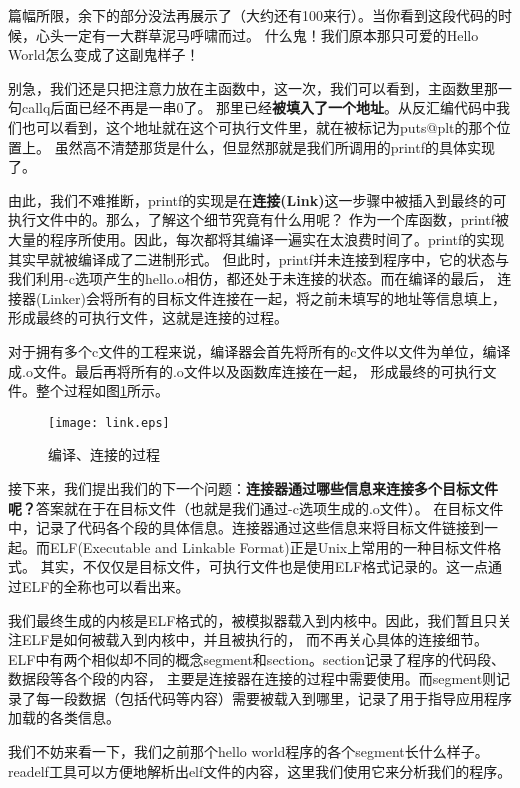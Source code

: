 篇幅所限，余下的部分没法再展示了（大约还有100来行）。当你看到这段代码的时候，心头一定有一大群草泥马呼啸而过。
什么鬼！我们原本那只可爱的Hello World怎么变成了这副鬼样子！

别急，我们还是只把注意力放在主函数中，这一次，我们可以看到，主函数里那一句callq后面已经不再是一串0了。
那里已经\textbf{被填入了一个地址}。从反汇编代码中我们也可以看到，这个地址就在这个可执行文件里，就在被标记为puts@plt的那个位置上。
虽然高不清楚那货是什么，但显然那就是我们所调用的printf的具体实现了。

由此，我们不难推断，printf的实现是在\textbf{连接(Link)}这一步骤中被插入到最终的可执行文件中的。那么，了解这个细节究竟有什么用呢？
作为一个库函数，printf被大量的程序所使用。因此，每次都将其编译一遍实在太浪费时间了。printf的实现其实早就被编译成了二进制形式。
但此时，printf并未连接到程序中，它的状态与我们利用-c选项产生的hello.o相仿，都还处于未连接的状态。而在编译的最后，
连接器(Linker)会将所有的目标文件连接在一起，将之前未填写的地址等信息填上，形成最终的可执行文件，这就是连接的过程。

对于拥有多个c文件的工程来说，编译器会首先将所有的c文件以文件为单位，编译成.o文件。最后再将所有的.o文件以及函数库连接在一起，
形成最终的可执行文件。整个过程如图\ref{fig:link}所示。

\begin{figure}[htbp]
  \centering
  \texttt{[image: link.eps]}
  \caption{编译、连接的过程}\label{fig:link} 
\end{figure}

接下来，我们提出我们的下一个问题：\textbf{连接器通过哪些信息来连接多个目标文件呢？}答案就在于在目标文件（也就是我们通过-c选项生成的.o文件）。
在目标文件中，记录了代码各个段的具体信息。连接器通过这些信息来将目标文件链接到一起。而ELF(Executable and Linkable Format)正是Unix上常用的一种目标文件格式。
其实，不仅仅是目标文件，可执行文件也是使用ELF格式记录的。这一点通过ELF的全称也可以看出来。

我们最终生成的内核是ELF格式的，被模拟器载入到内核中。因此，我们暂且只关注ELF是如何被载入到内核中，并且被执行的，
而不再关心具体的连接细节。ELF中有两个相似却不同的概念segment和section。section记录了程序的代码段、数据段等各个段的内容，
主要是连接器在连接的过程中需要使用。而segment则记录了每一段数据（包括代码等内容）需要被载入到哪里，记录了用于指导应用程序加载的各类信息。

我们不妨来看一下，我们之前那个hello world程序的各个segment长什么样子。readelf工具可以方便地解析出elf文件的内容，这里我们使用它来分析我们的程序。

